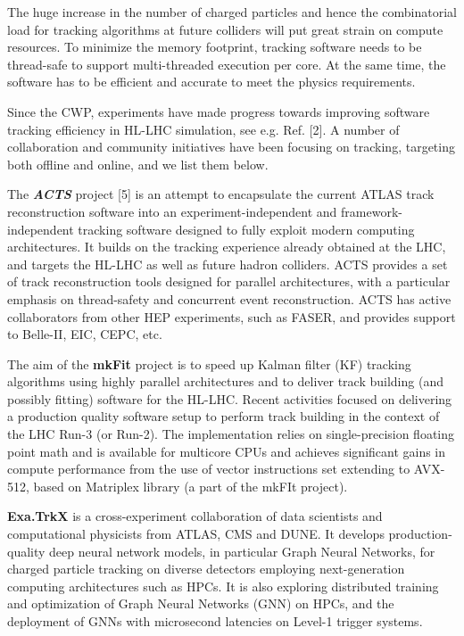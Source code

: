 \documentclass[10pt,a4paper]{article}
\begin{document}
The huge increase in the number of charged particles and hence the
combinatorial load for tracking algorithms at future colliders will put
great strain on compute resources. To minimize the memory footprint,
tracking software needs to be thread-safe to support multi-threaded
execution per core. At the same time, the software has to be efficient
and accurate to meet the physics requirements.

Since the CWP, experiments have made progress towards improving software
tracking efficiency in HL-LHC simulation, see e.g. Ref. {[}2{]}. A
number of collaboration and community initiatives have been focusing on
tracking, targeting both offline and online, and we list them below.

The \emph{\textbf{ACTS}} project {[}5{]} is an attempt to encapsulate
the current ATLAS track reconstruction software into an
experiment-independent and framework-independent tracking software
designed to fully exploit modern computing architectures. It builds on
the tracking experience already obtained at the LHC, and targets the
HL-LHC as well as future hadron colliders. ACTS provides a set of track
reconstruction tools designed for parallel architectures, with a
particular emphasis on thread-safety and concurrent event
reconstruction. ACTS has active collaborators from other HEP
experiments, such as FASER, and provides support to Belle-II, EIC, CEPC,
etc.

The aim of the \textbf{mkFit} project is to speed up Kalman filter (KF)
tracking algorithms using highly parallel architectures and to deliver
track building (and possibly fitting) software for the HL-LHC. Recent
activities focused on delivering a production quality software setup to
perform track building in the context of the LHC Run-3 (or Run-2). The
implementation relies on single-precision floating point math and is
available for multicore CPUs and achieves significant gains in compute
performance from the use of vector instructions set extending to
AVX-512, based on Matriplex library (a part of the mkFIt project).

\textbf{Exa.TrkX} is a cross-experiment collaboration of data scientists
and computational physicists from ATLAS, CMS and DUNE. It develops
production-quality deep neural network models, in particular Graph
Neural Networks, for charged particle tracking on diverse detectors
employing next-generation computing architectures such as HPCs. It is
also exploring distributed training and optimization of Graph Neural
Networks (GNN) on HPCs, and the deployment of GNNs with microsecond
latencies on Level-1 trigger systems.
\end{document}
